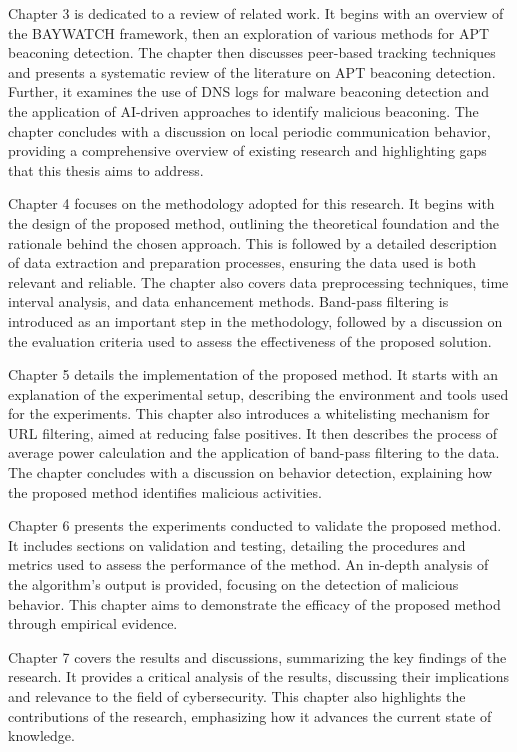 Chapter 3 is dedicated to a review of related work. It begins with an overview of the BAYWATCH framework, then an exploration of various methods for APT beaconing detection. The chapter then discusses peer-based tracking techniques and presents a systematic review of the literature on APT beaconing detection. Further, it examines the use of DNS logs for malware beaconing detection and the application of AI-driven approaches to identify malicious beaconing. The chapter concludes with a discussion on local periodic communication behavior, providing a comprehensive overview of existing research and highlighting gaps that this thesis aims to address.

Chapter 4 focuses on the methodology adopted for this research. It begins with the design of the proposed method, outlining the theoretical foundation and the rationale behind the chosen approach. This is followed by a detailed description of data extraction and preparation processes, ensuring the data used is both relevant and reliable. The chapter also covers data preprocessing techniques, time interval analysis, and data enhancement methods. Band-pass filtering is introduced as an important step in the methodology, followed by a discussion on the evaluation criteria used to assess the effectiveness of the proposed solution.

Chapter 5 details the implementation of the proposed method. It starts with an explanation of the experimental setup, describing the environment and tools used for the experiments. This chapter also introduces a whitelisting mechanism for URL filtering, aimed at reducing false positives. It then describes the process of average power calculation and the application of band-pass filtering to the data. The chapter concludes with a discussion on behavior detection, explaining how the proposed method identifies malicious activities.

Chapter 6 presents the experiments conducted to validate the proposed method. It includes sections on validation and testing, detailing the procedures and metrics used to assess the performance of the method. An in-depth analysis of the algorithm's output is provided, focusing on the detection of malicious behavior. This chapter aims to demonstrate the efficacy of the proposed method through empirical evidence.

Chapter 7 covers the results and discussions, summarizing the key findings of the research. It provides a critical analysis of the results, discussing their implications and relevance to the field of cybersecurity. This chapter also highlights the contributions of the research, emphasizing how it advances the current state of knowledge.

